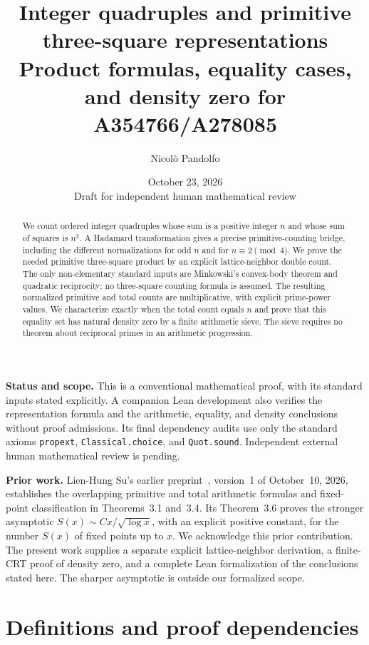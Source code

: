 \documentclass[11pt]{article}
\title{\textbf{Integer quadruples and primitive three-square representations}\\
\large Product formulas, equality cases, and density zero for A354766/A278085}
\author{Nicol\`o Pandolfo}
\date{October 23, 2026\\\small Draft for independent human mathematical review}
\theoremstyle{remark}
\begin{document}
\maketitle

\noindent\textbf{Status and scope.}
This is a conventional mathematical proof, with its standard inputs stated
explicitly. A companion Lean development also verifies the representation
formula and the arithmetic, equality, and density conclusions without proof
admissions. Its final dependency audits use only the standard axioms
\texttt{propext}, \texttt{Classical.choice}, and \texttt{Quot.sound}.
Independent external human mathematical review is pending.

\begin{abstract}
We count ordered integer quadruples whose sum is a positive integer $n$ and
whose sum of squares is $n^2$. A Hadamard transformation gives a precise
primitive-counting bridge, including the different normalizations for odd
$n$ and for $n\equiv2\pmod4$. We prove the needed primitive three-square
product by an explicit lattice-neighbor double count. The only
non-elementary standard inputs are Minkowski's convex-body theorem and
quadratic reciprocity; no three-square counting formula is assumed. The
resulting normalized primitive and total counts are multiplicative, with
explicit prime-power values. We characterize exactly when the total count
equals $n$ and prove that this equality set has natural density zero by a
finite arithmetic sieve. The sieve requires no theorem about reciprocal
primes in an arithmetic progression.
\end{abstract}

\noindent\textbf{Prior work.}
Lien-Hung Su's earlier preprint~\cite{su}, version~1 of October~10, 2026,
establishes the overlapping primitive and total arithmetic formulas and
fixed-point classification in Theorems~3.1 and~3.4. Its Theorem~3.6 proves
the stronger asymptotic $S(x)\sim Cx/\sqrt{\log x}$, with an explicit
positive constant, for the number $S(x)$ of fixed points up to $x$.
We acknowledge this prior contribution. The present work supplies a separate
explicit lattice-neighbor derivation, a finite-CRT proof of density zero,
and a complete Lean formalization of the conclusions stated here.
The sharper asymptotic is outside our formalized scope.

\section{Definitions and proof dependencies}
\end{document}
